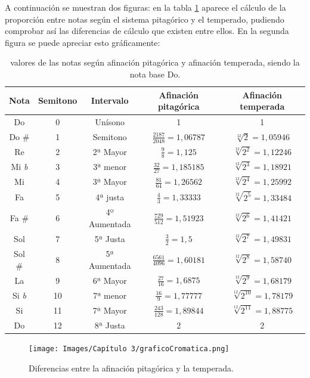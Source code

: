 \documentclass[a4paper, openright, 11pt, titlepage]{report}
\theoremstyle{definition}\newtheorem{defin}[propo]{Definition}
\theoremstyle{definition}\newtheorem{obser}[propo]{Remark}
\theoremstyle{definition}\newtheorem{ejem}[propo]{Ejemplo}
\theoremstyle{definition}\newtheorem{algoritmo}[propo]{Algoritmo}
\begin{document}
A continuación se muestran dos figuras: en la tabla \ref{calculos} aparece el cálculo de la proporción entre notas según el sistema pitagórico y el temperado, pudiendo comprobar así las diferencias de cálculo que existen entre ellos. En la segunda figura se puede apreciar esto gráficamente:
\begin{table}[H]
    \centering
    \begin{tabular}{|c|c|c|c|c|}
    \hline
         Nota & Semitono & Intervalo & Afinación pitagórica & Afinación temperada\\
         \hline
         \hline
         Do & 0 & Unísono & 1 & 1\\
         Do \# & 1 & Semitono & $\frac{2187}{2048} = 1,06787$ & $\sqrt[12]{2} = 1,05946$\\
         Re & 2 & 2ª Mayor & $\frac{9}{8} = 1,125$ & $\sqrt[12]{2^{2}} = 1,12246$\\
         Mi \textit{b} & 3 & 3ª menor & $\frac{32}{27} = 1,185185$ & $\sqrt[12]{2^{3}} = 1,18921$\\
         Mi & 4 & 3ª Mayor & $\frac{81}{64} = 1,26562$ & $\sqrt[12]{2^{4}} = 1,25992$\\
         Fa & 5 & 4ª justa & $\frac{4}{3} = 1,33333$ & $\sqrt[12]{2^{5}} = 1,33484$\\
         Fa \# & 6 & 4º Aumentada & $\frac{729}{512} = 1,51923$ & $\sqrt[12]{2^{6}} = 1,41421$\\
         Sol & 7 & 5ª Justa & $\frac{3}{2} = 1,5$ & $\sqrt[12]{2^{7}} = 1,49831$\\
         Sol \# & 8 & 5ª Aumentada & $\frac{6561}{4096} = 1,60181$ & $\sqrt[12]{2^{8}} = 1,58740$\\
         La & 9 & 6ª Mayor & $\frac{27}{16} = 1,6875$ & $\sqrt[12]{2^{9}} = 1,68179$\\
         Si \textit{b} & 10 & 7ª menor & $\frac{16}{9} = 1,77777$ & $\sqrt[12]{2^{10}} = 1,78179$\\
         Si & 11 & 7ª Mayor & $\frac{243}{128} = 1,89844$ & $\sqrt[12]{2^{11}} = 1,88775$\\
         Do & 12 & 8ª Justa & 2 & 2\\
         \hline
    \end{tabular}
    \caption{valores de las notas según afinación pitagórica y afinación temperada, siendo la nota base Do.}
    \label{calculos}
\end{table}
\begin{figure}[H]
    \centering
    \texttt{[image: Images/Capítulo 3/graficoCromatica.png]}
    \caption{Diferencias entre la afinación pitagórica y la temperada.}
    \label{grafica}
\end{figure}
\end{document}
